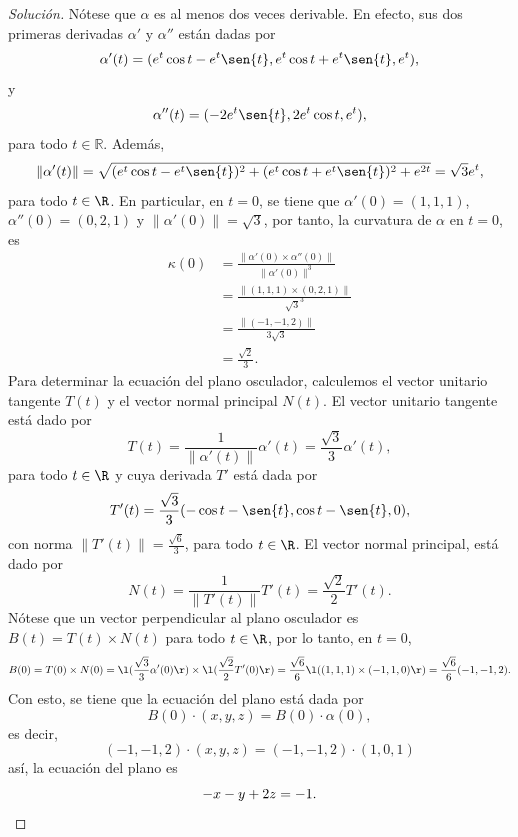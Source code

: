 \documentclass[a4,11pt]{aleph-notas}
\begin{document}
\begin{proof}[Solución]
Nótese que $\alpha$ es al menos dos veces derivable. En efecto, sus dos primeras derivadas $\alpha'$ y $\alpha''$ están dadas por
    \[
        \alpha'(t) = (e^{t}\cos{t} - e^{t}\sen{t}, e^{t}\cos{t} + e^{t}\sen{t}, e^{t}),
    \]
    y
    \[
        \alpha''(t) = (-2e^{t}\sen{t}, 2e^{t}\cos{t}, e^{t}),
    \]
    para todo $t \in \mathbb{R}$. Además,
    \[
        \| \alpha'(t) \| = \sqrt{(e^{t}\cos{t} - e^{t}\sen{t})^{2} + (e^{t}\cos{t} + e^{t}\sen{t})^2 + e^{2t}} = \sqrt{3} e^{t},
    \]
    para todo $t\in\R$. En particular, en $t = 0$, se tiene que $\alpha'(0)= (1,1,1)$, $\alpha''(0) = (0,2,1)$ y $\|\alpha'(0)\| = \sqrt{3}$, por tanto, la curvatura de $\alpha$ en $t = 0$, es
    \begin{align*}
        \kappa(0) 
            &= \frac{\|\alpha'(0) \times \alpha''(0) \|}{\| \alpha'(0) \|^{3}}\\
            &= \frac{\|(1,1,1) \times (0,2,1) \|}{\sqrt{3}^{3}}\\
            &= \frac{\|(-1,-1,2)\|}{3\sqrt{3}}\\
            &= \frac{\sqrt{2}}{3}.
    \end{align*}
    Para determinar la ecuación del plano osculador, calculemos el vector unitario tangente $T(t)$ y el vector normal principal $N(t)$. El vector unitario tangente está dado por
    \[
        T(t) = \frac{1}{\| \alpha'(t)\|}\alpha'(t) = \frac{\sqrt{3}}{3}\alpha'(t),
    \]
    para todo $t\in\R$ y cuya derivada $T'$ está dada por
    \[
        T'(t) = \frac{\sqrt{3}}{3}(-\cos{t} - \sen{t}, \cos{t} - \sen{t}, 0), 
    \]
    con norma $\| T'(t)\| = \frac{\sqrt{6}}{3}$, para todo $t \in\R$. El vector normal principal, está dado por
    \[
        N(t) = \frac{1}{\|T'(t)\|}T'(t) = \frac{\sqrt{2}}{2}T'(t).
    \]
    Nótese que un vector perpendicular al plano osculador es $B(t) = T(t) \times N(t)$ para todo $t\in\R$, por lo tanto, en $t = 0$, 
    \[
        B(0) = T(0) \times N(0) 
        = \l(\frac{\sqrt{3}}{3}\alpha'(0)\r)\times \l(\frac{\sqrt{2}}{2}T'(0)\r)
        =\frac{\sqrt{6}}{6} \l( (1,1,1) \times (-1, 1, 0) \r)
        = \frac{\sqrt{6}}{6} (-1, -1, 2).
    \]
    Con esto, se tiene que la ecuación del plano está dada por
    \[
        B(0)\cdot (x,y,z) = B(0)\cdot \alpha(0),
    \]
    es decir,
    \[
        (-1, -1, 2)\cdot(x,y,z) =(-1, -1, 2)\cdot(1, 0, 1)
    \]
    así, la ecuación del plano es
    \[
        -x - y + 2z = -1.\qedhere
    \]
\end{proof}
\end{document}
